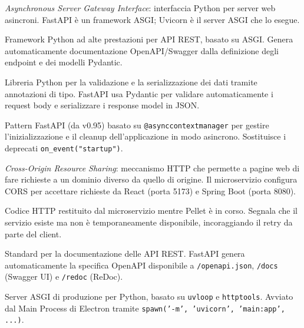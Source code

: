 \documentclass[a4paper,12pt]{article}
\begin{document}
\begin{description}[leftmargin=4cm, labelwidth=3.8cm, labelsep=0.2cm]

\item[\textbf{ASGI}]
  \textit{Asynchronous Server Gateway Interface}: interfaccia Python per
  server web asincroni. FastAPI \`{e} un framework ASGI; Uvicorn \`{e}
  il server ASGI che lo esegue.

\item[\textbf{FastAPI}]
  Framework Python ad alte prestazioni per API REST, basato su ASGI.
  Genera automaticamente documentazione OpenAPI/Swagger dalla definizione
  degli endpoint e dei modelli Pydantic.

\item[\textbf{Pydantic v2}]
  Libreria Python per la validazione e la serializzazione dei dati tramite
  annotazioni di tipo. FastAPI usa Pydantic per validare automaticamente
  i request body e serializzare i response model in JSON.

\item[\textbf{Lifespan handler}]
  Pattern FastAPI (da v0.95) basato su \texttt{@asynccontextmanager} per
  gestire l'inizializzazione e il cleanup dell'applicazione in modo
  asincrono. Sostituisce i deprecati \texttt{on\_event("startup")}.

\item[\textbf{CORS}]
  \textit{Cross-Origin Resource Sharing}: meccanismo HTTP che permette a
  pagine web di fare richieste a un dominio diverso da quello di origine.
  Il microservizio configura CORS per accettare richieste da React
  (porta 5173) e Spring Boot (porta 8080).

\item[\textbf{503 Service Unavailable}]
  Codice HTTP restituito dal microservizio mentre Pellet \`{e} in corso.
  Segnala che il servizio esiste ma non \`{e} temporaneamente disponibile,
  incoraggiando il retry da parte del client.

\item[\textbf{OpenAPI}]
  Standard per la documentazione delle API REST. FastAPI genera
  automaticamente la specifica OpenAPI disponibile a
  \texttt{/openapi.json}, \texttt{/docs} (Swagger UI) e
  \texttt{/redoc} (ReDoc).

\item[\textbf{Uvicorn}]
  Server ASGI di produzione per Python, basato su \texttt{uvloop} e
  \texttt{httptools}. Avviato dal Main Process di Electron tramite
  \texttt{spawn('-m', 'uvicorn', 'main:app', ...)}.

\end{description}
\end{document}
